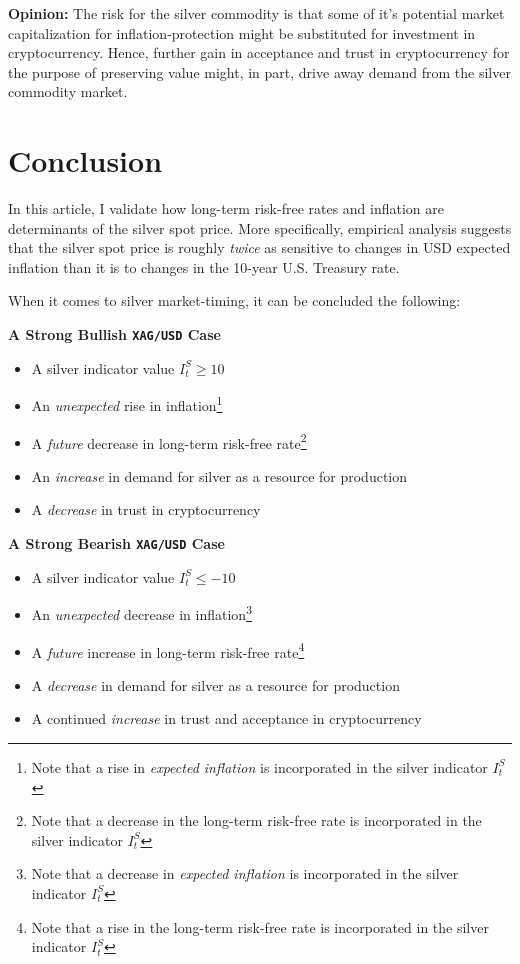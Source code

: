 \documentclass[
  12pt,
]{article}
\providecommand{\tightlist}{%
  \setlength{\itemsep}{0pt}\setlength{\parskip}{0pt}}
\begin{document}
\textbf{Opinion:} The risk for the silver commodity is that some of it's
potential market capitalization for inflation-protection might be
substituted for investment in cryptocurrency. Hence, further gain in
acceptance and trust in cryptocurrency for the purpose of preserving
value might, in part, drive away demand from the silver commodity
market.

\newpage

\hypertarget{conclusion}{%
\section{Conclusion}\label{conclusion}}

In this article, I validate how long-term risk-free rates and inflation
are determinants of the silver spot price. More specifically, empirical
analysis suggests that the silver spot price is roughly \emph{twice} as
sensitive to changes in USD expected inflation than it is to changes in
the 10-year U.S. Treasury rate.

When it comes to silver market-timing, it can be concluded the
following:

\textbf{A Strong Bullish \texttt{XAG/USD} Case}

\begin{itemize}
\tightlist
\item
  A silver indicator value \(I^S_t \geq 10\)
\item
  An \emph{unexpected} rise in inflation\footnote{Note that a rise in
    \emph{expected inflation} is incorporated in the silver indicator
    \(I^S_t\)}
\item
  A \emph{future} decrease in long-term risk-free rate\footnote{Note
    that a decrease in the long-term risk-free rate is incorporated in
    the silver indicator \(I^S_t\)}
\item
  An \emph{increase} in demand for silver as a resource for production
\item
  A \emph{decrease} in trust in cryptocurrency
\end{itemize}

\textbf{A Strong Bearish \texttt{XAG/USD} Case}

\begin{itemize}
\tightlist
\item
  A silver indicator value \(I^S_t \leq -10\)
\item
  An \emph{unexpected} decrease in inflation\footnote{Note that a
    decrease in \emph{expected inflation} is incorporated in the silver
    indicator \(I^S_t\)}
\item
  A \emph{future} increase in long-term risk-free rate\footnote{Note
    that a rise in the long-term risk-free rate is incorporated in the
    silver indicator \(I^S_t\)}
\item
  A \emph{decrease} in demand for silver as a resource for production
\item
  A continued \emph{increase} in trust and acceptance in cryptocurrency
\end{itemize}
\end{document}
